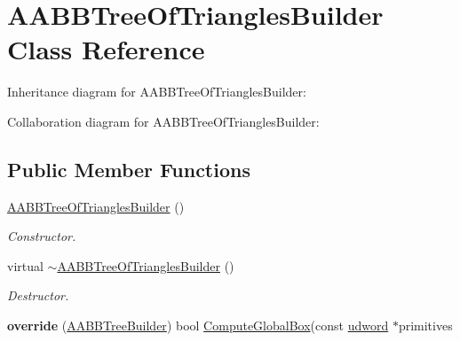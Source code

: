 \hypertarget{class_a_a_b_b_tree_of_triangles_builder}{\section{A\+A\+B\+B\+Tree\+Of\+Triangles\+Builder Class Reference}
\label{class_a_a_b_b_tree_of_triangles_builder}
}


Inheritance diagram for A\+A\+B\+B\+Tree\+Of\+Triangles\+Builder\+:


Collaboration diagram for A\+A\+B\+B\+Tree\+Of\+Triangles\+Builder\+:
\subsection*{Public Member Functions}
\begin{DoxyCompactItemize}
\item 
\hypertarget{class_a_a_b_b_tree_of_triangles_builder_ade9a5c88862b3ac659cbc9060e794ba6}{\hyperlink{class_a_a_b_b_tree_of_triangles_builder_ade9a5c88862b3ac659cbc9060e794ba6}{A\+A\+B\+B\+Tree\+Of\+Triangles\+Builder} ()}\label{class_a_a_b_b_tree_of_triangles_builder_ade9a5c88862b3ac659cbc9060e794ba6}

\begin{DoxyCompactList}\small\item\em Constructor. \end{DoxyCompactList}\item 
\hypertarget{class_a_a_b_b_tree_of_triangles_builder_a33247c5452e9ea6d17f3e1721ce23980}{virtual \hyperlink{class_a_a_b_b_tree_of_triangles_builder_a33247c5452e9ea6d17f3e1721ce23980}{$\sim$\+A\+A\+B\+B\+Tree\+Of\+Triangles\+Builder} ()}\label{class_a_a_b_b_tree_of_triangles_builder_a33247c5452e9ea6d17f3e1721ce23980}

\begin{DoxyCompactList}\small\item\em Destructor. \end{DoxyCompactList}\item 
\hypertarget{class_a_a_b_b_tree_of_triangles_builder_a2f6283c1e6984f911b174f782855382e}{{\bfseries override} (\hyperlink{class_a_a_b_b_tree_builder}{A\+A\+B\+B\+Tree\+Builder}) bool \hyperlink{class_a_a_b_b_tree_builder_adde85a9974ea5dc2c74fd851e11abf75}{Compute\+Global\+Box}(const \hyperlink{_ice_types_8h_a44c6f1920ba5551225fb534f9d1a1733}{udword} $\ast$primitives}\label{class_a_a_b_b_tree_of_triangles_builder_a2f6283c1e6984f911b174f782855382e}


\end{DoxyCompactItemize}

